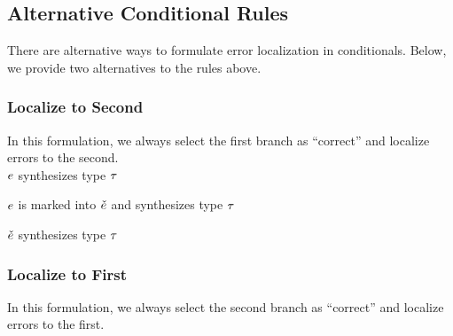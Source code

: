 \subsection{Alternative Conditional Rules}
There are alternative ways to formulate error localization in conditionals. Below, we provide two
alternatives to the rules above.

\subsubsection{Localize to Second}
In this formulation, we always select the first branch as ``correct'' and localize errors to the
second. \\

\judgbox{\ctxSynTypeU{\ctx}{\EMV}{\TMV}} $\EMV$ synthesizes type $\TMV$
%
\begin{mathpar}
\end{mathpar}

\judgbox{\ctxSynFixedInto{\ctx}{\EMV}{\ECMV}{\TMV}} $\EMV$ is marked into $\ECMV$ and synthesizes type $\TMV$
%
\begin{mathpar}
\end{mathpar}

\judgbox{\ctxSynTypeM{\ctx}{\ECMV}{\TMV}} $\ECMV$ synthesizes type $\TMV$
%
\begin{mathpar}
\end{mathpar}

\subsubsection{Localize to First}
In this formulation, we always select the second branch as ``correct'' and localize errors to the
first. \\

